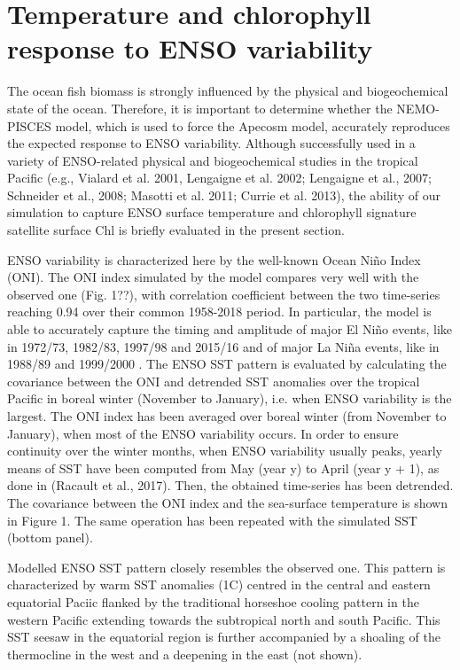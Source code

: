 \section{Temperature and chlorophyll response to ENSO variability}
\label{sec:pisces}

The ocean fish biomass is strongly influenced by the physical and biogeochemical state of the ocean. Therefore, it is important to determine whether the NEMO-PISCES model, which is used to force the Apecosm model, accurately reproduces the expected response to ENSO variability. Although successfully used in a variety of ENSO-related physical and biogeochemical studies in the tropical Pacific (e.g., Vialard et al. 2001, Lengaigne et al. 2002; Lengaigne et al., 2007; Schneider et al., 2008; Masotti et al. 2011; Currie et al. 2013), the ability of our simulation to capture ENSO surface temperature and chlorophyll signature satellite surface Chl is briefly evaluated in the present section.

ENSO variability is characterized here by the well-known Ocean Niño Index (ONI). The ONI index simulated by the model compares very well with the observed one (Fig. 1??), with correlation coefficient between the two time-series reaching 0.94 over their common 1958-2018 period. In particular, the model is able to accurately capture the timing and amplitude of major El Niño events, like in 1972/73, 1982/83, 1997/98 and 2015/16 and of major La Niña events, like in 1988/89 and 1999/2000 . The ENSO SST pattern is evaluated  by calculating the covariance between the ONI and detrended SST anomalies over the tropical Pacific in boreal winter (November to January), i.e. when ENSO variability is the largest. The ONI index has been averaged over boreal winter (from November to January), when most of  the ENSO variability occurs. In order to ensure continuity over the winter months, when ENSO variability usually peaks, yearly means of SST have been computed from May (year y) to April (year y + 1), as done in (Racault et al., 2017). Then, the obtained time-series has been detrended. The covariance between the ONI index and the sea-surface temperature is shown in Figure 1. The same operation has been repeated with the simulated SST (bottom panel).

Modelled ENSO SST  pattern closely resembles  the observed one. This pattern is characterized by warm SST anomalies (1\degree{}C) centred in the central and eastern equatorial Paciic  flanked by the traditional horseshoe cooling pattern in the western Pacific extending towards the subtropical north and south Pacific. This SST seesaw in the equatorial region is further accompanied by a shoaling of the thermocline in the west and a deepening in the east (not shown).

